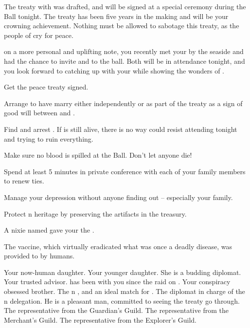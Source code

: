 \documentclass[char]{NeptuneBall}
\begin{document}
The treaty with \pPacifica{} was drafted, and will be signed at a special ceremony during the Ball tonight. The treaty has been five years in the making and will be your crowning achievement. Nothing must be allowed to sabotage this treaty, as the people of \pAtlantis{} cry for peace.

on a more personal and uplifting note, you recently met your \cAriel{\offspring} by the seaside and had the chance to invite \cAriel{\them} and \cAriel{\their} \cWillow{\offspring} to the ball. Both will be in attendance tonight, and you look forward to catching up with your \cAriel{\offsping} while showing \cWillow{} the wonders of \pAtlantis{}.

\begin{itemz}[Goals]
  \item Get the peace treaty signed.
  \item Arrange to have \cPrincess{} marry \cPrince{} either independently or as part of the treaty as a sign of good will between \pAtlantis{} and \pPacifica{}.
    \item Find and arrest \cWitch{}. If \cWitch{\they} is still alive, there is no way \cWitch{\they} could resist attending tonight and trying to ruin everything.
  \item Make sure no blood is spilled at the Ball. Don't let anyone die!
  \item Spend at least 5 minutes in private conference with each of your family members to renew ties.
  \item Manage your depression without anyone finding out -- especially your family.
    \item Protect \pAtlantis{}n heritage by preserving the artifacts in the treasury.
\end{itemz}

\begin{itemz}[Trivia]
	\item A nixie named \cNixie{} gave your \cExKing{\parent} the \iTrident{}.
  \item The \pPolio{} vaccine, which virtually eradicated what was once a deadly disease, was provided to \pAtlantis{} by humans.
\end{itemz}

\begin{contacts}
  \contact{\cAriel{}} Your now-human daughter.
  \contact{\cPrincess{}} Your younger daughter. She is a budding diplomat.
  \contact{\cManta{}} Your trusted advisor. \cManta{\They{}} has been with you since the raid on \pPacifica{}.
  \contact{\cPlant{}} Your conspiracy obsessed brother.
  \contact{\cPrince{}} The \pPacifica{}n \cPrince{\prince}, and an ideal match for \cPrincess{}.
  \contact{\cDiplomat{}} The diplomat in charge of the \pPacifica{}n delegation. He is a pleasant man, committed to seeing the treaty go through.
  \contact{\cGeneral{}} The representative from the Guardian's Guild.
  \contact{\cSlave{}} The representative from the Merchant's Guild.
  \contact{\cPriest{}} The representative from the Explorer's Guild.
\end{contacts}
\end{document}
